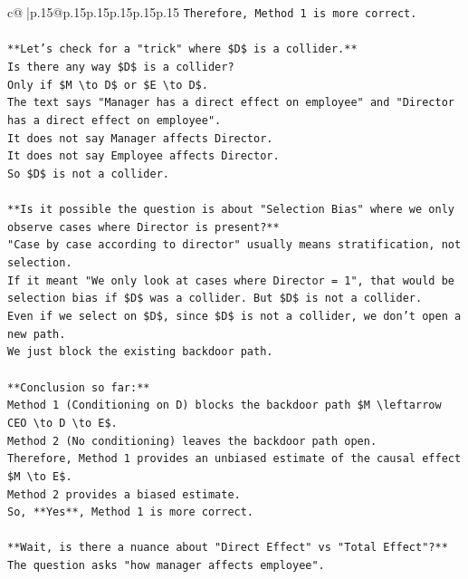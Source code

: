 \documentclass{article}
\begin{document}
{\begin{supertabular}{c@{$\;$}|p{.15\linewidth}@{}p{.15\linewidth}p{.15\linewidth}p{.15\linewidth}p{.15\linewidth}p{.15\linewidth}}
{{{\texttt{Therefore, Method 1 is more correct.} \\
\\ 
\texttt{**Let's check for a "trick" where \$D\$ is a collider.**} \\
\texttt{Is there any way \$D\$ is a collider?} \\
\texttt{Only if \$M \textbackslash{}to D\$ or \$E \textbackslash{}to D\$.} \\
\texttt{The text says "Manager has a direct effect on employee" and "Director has a direct effect on employee".} \\
\texttt{It does not say Manager affects Director.} \\
\texttt{It does not say Employee affects Director.} \\
\texttt{So \$D\$ is not a collider.} \\
\\ 
\texttt{**Is it possible the question is about "Selection Bias" where we only observe cases where Director is present?**} \\
\texttt{"Case by case according to director" usually means stratification, not selection.} \\
\texttt{If it meant "We only look at cases where Director = 1", that would be selection bias if \$D\$ was a collider. But \$D\$ is not a collider.} \\
\texttt{Even if we select on \$D\$, since \$D\$ is not a collider, we don't open a new path.} \\
\texttt{We just block the existing backdoor path.} \\
\\ 
\texttt{**Conclusion so far:**} \\
\texttt{Method 1 (Conditioning on D) blocks the backdoor path \$M \textbackslash{}leftarrow CEO \textbackslash{}to D \textbackslash{}to E\$.} \\
\texttt{Method 2 (No conditioning) leaves the backdoor path open.} \\
\texttt{Therefore, Method 1 provides an unbiased estimate of the causal effect \$M \textbackslash{}to E\$.} \\
\texttt{Method 2 provides a biased estimate.} \\
\texttt{So, **Yes**, Method 1 is more correct.} \\
\\ 
\texttt{**Wait, is there a nuance about "Direct Effect" vs "Total Effect"?**} \\
\texttt{The question asks "how manager affects employee".} \\
}}}
\end{supertabular}}
\end{document}
